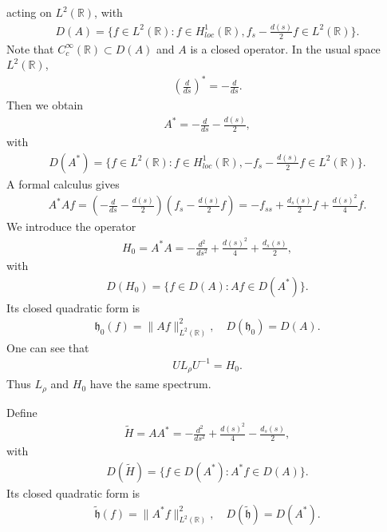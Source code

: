 \documentclass{article}
\theoremstyle{definition} \theoremstyle{remark}
\numberwithin{equation}{section}
\newcommand{\R}{\mathbb{R}}
\begin{document}
	acting on $L^2(\R)$, with
	\begin{align*}
		D(A) = \big\{f \in L^2(\R): f \in H^1_{loc}(\R), f_s - \frac{d(s)}{2}f \in L^2(\R)\big\}.
	\end{align*}
	Note that $C_c^\infty(\R) \subset D(A)$ and $A$ is a closed operator.
	In the usual space $L^2(\R)$,
	\begin{align*}
		\left(\frac{d}{ds}\right)^* = -\frac{d}{ds}.
	\end{align*}
    Then we obtain
	\begin{align*}
		A^* = -\frac{d}{ds} - \frac{d(s)}{2},
	\end{align*}
	with
	\begin{align*}
		D(A^*) = \big\{f \in L^2(\R): f \in H^1_{loc}(\R), -f_s - \frac{d(s)}{2}f \in L^2(\R)\big\}.
	\end{align*}
	A formal calculus gives
	\begin{align*}
		A^* A f = \left(-\frac{d}{ds} - \frac{d(s)}{2}\right)\left(f_s - \frac{d(s)}{2}f\right) = -f_{ss} + \frac{d_s(s)}{2}f + \frac{d(s)^2}{4}f.
	\end{align*}
	We introduce the operator
	\begin{align*}
		H_0 = A^* A = -\frac{d^2}{ds^2} + \frac{d(s)^2}{4} + \frac{d_s(s)}{2},
	\end{align*}
	with
	\begin{align*}
		D(H_0) = \big\{f \in D(A): Af \in D(A^*)\big\}.
	\end{align*}
	Its closed quadratic form is
	\begin{align} \label{formdomainofH_0}
		\mathfrak{h}_0(f) = \|Af\|_{L^2(\R)}^2, \quad D(\mathfrak{h}_0) = D(A).
	\end{align}
	One can see that
	\begin{align*}
		U L_\rho U^{-1} = H_0.
	\end{align*}
	Thus $L_\rho$ and $H_0$ have the same spectrum.

	Define
	\begin{align*}
		\widetilde{H} = A A^* = -\frac{d^2}{ds^2} + \frac{d(s)^2}{4} - \frac{d_s(s)}{2},
	\end{align*}
	with
	\begin{align*}
		D(\widetilde{H}) = \big\{f \in D(A^*): A^*f \in D(A)\big\}.
	\end{align*}
	Its closed quadratic form is
	\begin{align} \label{formdomainoftildeH}
		\widetilde{\mathfrak{h}}(f) = \|A^*f\|_{L^2(\R)}^2, \quad D(\widetilde{\mathfrak{h}}) = D(A^*).
	\end{align}
\end{document}
